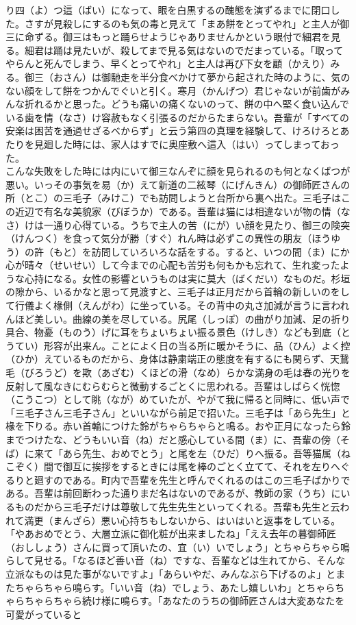 \documentclass{book}
\begin{document}
り四（よ）つ這（ばい）になって、眼を白黒するの醜態を演ずるまでに閉口した。さすが見殺しにするのも気の毒と見えて「まあ餅をとってやれ」と主人が御三に命ずる。御三はもっと踊らせようじゃありませんかという眼付で細君を見る。細君は踊は見たいが、殺してまで見る気はないのでだまっている。「取ってやらんと死んでしまう、早くとってやれ」と主人は再び下女を顧（かえり）みる。御三（おさん）は御馳走を半分食べかけて夢から起された時のように、気のない顔をして餅をつかんでぐいと引く。寒月（かんげつ）君じゃないが前歯がみんな折れるかと思った。どうも痛いの痛くないのって、餅の中へ堅く食い込んでいる歯を情（なさ）け容赦もなく引張るのだからたまらない。吾輩が「すべての安楽は困苦を通過せざるべからず」と云う第四の真理を経験して、けろけろとあたりを見廻した時には、家人はすでに奥座敷へ這入（はい）ってしまっておった。\\
こんな失敗をした時には内にいて御三なんぞに顔を見られるのも何となくばつが悪い。いっその事気を易（か）えて新道の二絃琴（にげんきん）の御師匠さんの所（とこ）の三毛子（みけこ）でも訪問しようと台所から裏へ出た。三毛子はこの近辺で有名な美貌家（びぼうか）である。吾輩は猫には相違ないが物の情（なさ）けは一通り心得ている。うちで主人の苦（にが）い顔を見たり、御三の険突（けんつく）を食って気分が勝（すぐ）れん時は必ずこの異性の朋友（ほうゆう）の許（もと）を訪問していろいろな話をする。すると、いつの間（ま）にか心が晴々（せいせい）して今までの心配も苦労も何もかも忘れて、生れ変ったような心持になる。女性の影響というものは実に莫大（ばくだい）なものだ。杉垣の隙から、いるかなと思って見渡すと、三毛子は正月だから首輪の新しいのをして行儀よく椽側（えんがわ）に坐っている。その背中の丸さ加減が言うに言われんほど美しい。曲線の美を尽している。尻尾（しっぽ）の曲がり加減、足の折り具合、物憂（ものう）げに耳をちょいちょい振る景色（けしき）なども到底（とうてい）形容が出来ん。ことによく日の当る所に暖かそうに、品（ひん）よく控（ひか）えているものだから、身体は静粛端正の態度を有するにも関らず、天鵞毛（びろうど）を欺（あざむ）くほどの滑（なめ）らかな満身の毛は春の光りを反射して風なきにむらむらと微動するごとくに思われる。吾輩はしばらく恍惚（こうこつ）として眺（なが）めていたが、やがて我に帰ると同時に、低い声で「三毛子さん三毛子さん」といいながら前足で招いた。三毛子は「あら先生」と椽を下りる。赤い首輪につけた鈴がちゃらちゃらと鳴る。おや正月になったら鈴までつけたな、どうもいい音（ね）だと感心している間（ま）に、吾輩の傍（そば）に来て「あら先生、おめでとう」と尾を左（ひだ）りへ振る。吾等猫属（ねこぞく）間で御互に挨拶をするときには尾を棒のごとく立てて、それを左りへぐるりと廻すのである。町内で吾輩を先生と呼んでくれるのはこの三毛子ばかりである。吾輩は前回断わった通りまだ名はないのであるが、教師の家（うち）にいるものだから三毛子だけは尊敬して先生先生といってくれる。吾輩も先生と云われて満更（まんざら）悪い心持ちもしないから、はいはいと返事をしている。「やあおめでとう、大層立派に御化粧が出来ましたね」「ええ去年の暮御師匠（おししょう）さんに買って頂いたの、宜（い）いでしょう」とちゃらちゃら鳴らして見せる。「なるほど善い音（ね）ですな、吾輩などは生れてから、そんな立派なものは見た事がないですよ」「あらいやだ、みんなぶら下げるのよ」とまたちゃらちゃら鳴らす。「いい音（ね）でしょう、あたし嬉しいわ」とちゃらちゃらちゃらちゃら続け様に鳴らす。「あなたのうちの御師匠さんは大変あなたを可愛がっていると
\end{document}
